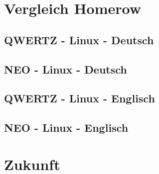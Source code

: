 \documentclass{beamer}
\begin{document}
\section{Vergleich Homerow}

\subsection{QWERTZ - Linux - Deutsch}
\frame{ 
  
}
\subsection{NEO - Linux - Deutsch}
\frame{
  
}

\subsection{QWERTZ - Linux - Englisch}
\frame{ 
  
}
\subsection{NEO - Linux - Englisch}
\frame{
  
}



\section{Zukunft}
\end{document}
